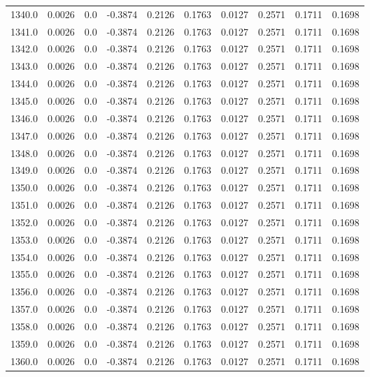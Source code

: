 \begin{longtable}{lrrrrrrrrr}
1340.0 & 0.0026 & 0.0 & -0.3874 & 0.2126 & 0.1763 & 0.0127 & 0.2571 & 0.1711 & 0.1698 \\
1341.0 & 0.0026 & 0.0 & -0.3874 & 0.2126 & 0.1763 & 0.0127 & 0.2571 & 0.1711 & 0.1698 \\
1342.0 & 0.0026 & 0.0 & -0.3874 & 0.2126 & 0.1763 & 0.0127 & 0.2571 & 0.1711 & 0.1698 \\
1343.0 & 0.0026 & 0.0 & -0.3874 & 0.2126 & 0.1763 & 0.0127 & 0.2571 & 0.1711 & 0.1698 \\
1344.0 & 0.0026 & 0.0 & -0.3874 & 0.2126 & 0.1763 & 0.0127 & 0.2571 & 0.1711 & 0.1698 \\
1345.0 & 0.0026 & 0.0 & -0.3874 & 0.2126 & 0.1763 & 0.0127 & 0.2571 & 0.1711 & 0.1698 \\
1346.0 & 0.0026 & 0.0 & -0.3874 & 0.2126 & 0.1763 & 0.0127 & 0.2571 & 0.1711 & 0.1698 \\
1347.0 & 0.0026 & 0.0 & -0.3874 & 0.2126 & 0.1763 & 0.0127 & 0.2571 & 0.1711 & 0.1698 \\
1348.0 & 0.0026 & 0.0 & -0.3874 & 0.2126 & 0.1763 & 0.0127 & 0.2571 & 0.1711 & 0.1698 \\
1349.0 & 0.0026 & 0.0 & -0.3874 & 0.2126 & 0.1763 & 0.0127 & 0.2571 & 0.1711 & 0.1698 \\
1350.0 & 0.0026 & 0.0 & -0.3874 & 0.2126 & 0.1763 & 0.0127 & 0.2571 & 0.1711 & 0.1698 \\
1351.0 & 0.0026 & 0.0 & -0.3874 & 0.2126 & 0.1763 & 0.0127 & 0.2571 & 0.1711 & 0.1698 \\
1352.0 & 0.0026 & 0.0 & -0.3874 & 0.2126 & 0.1763 & 0.0127 & 0.2571 & 0.1711 & 0.1698 \\
1353.0 & 0.0026 & 0.0 & -0.3874 & 0.2126 & 0.1763 & 0.0127 & 0.2571 & 0.1711 & 0.1698 \\
1354.0 & 0.0026 & 0.0 & -0.3874 & 0.2126 & 0.1763 & 0.0127 & 0.2571 & 0.1711 & 0.1698 \\
1355.0 & 0.0026 & 0.0 & -0.3874 & 0.2126 & 0.1763 & 0.0127 & 0.2571 & 0.1711 & 0.1698 \\
1356.0 & 0.0026 & 0.0 & -0.3874 & 0.2126 & 0.1763 & 0.0127 & 0.2571 & 0.1711 & 0.1698 \\
1357.0 & 0.0026 & 0.0 & -0.3874 & 0.2126 & 0.1763 & 0.0127 & 0.2571 & 0.1711 & 0.1698 \\
1358.0 & 0.0026 & 0.0 & -0.3874 & 0.2126 & 0.1763 & 0.0127 & 0.2571 & 0.1711 & 0.1698 \\
1359.0 & 0.0026 & 0.0 & -0.3874 & 0.2126 & 0.1763 & 0.0127 & 0.2571 & 0.1711 & 0.1698 \\
1360.0 & 0.0026 & 0.0 & -0.3874 & 0.2126 & 0.1763 & 0.0127 & 0.2571 & 0.1711 & 0.1698 \\

\end{longtable}
